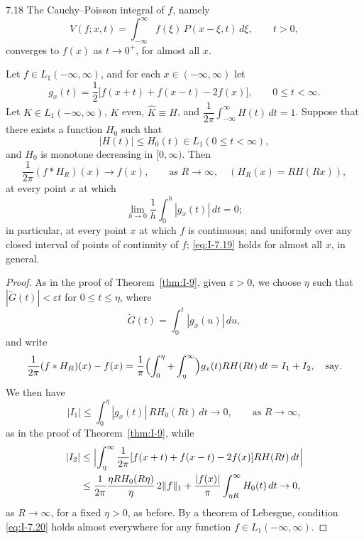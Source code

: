 \begin{nstmt}{7.18}\label{eq:I-7.18}
The Cauchy--Poisson integral of $f$, namely
\[
V(f;x,t)=\int_{-\infty}^{\infty}f(\xi)\,P(x-\xi,t)\,d\xi,\qquad t>0,
\]
converges to $f(x)$ as $t\to 0^+$, for almost all $x$.
\end{nstmt}

\begin{theorem}\label{thm:I-10}
Let $f\in L_1(-\infty,\infty)$, and for each $x\in(-\infty,\infty)$ let
\begin{equation*}
g_x(t)=\frac12\bigl[f(x+t)+f(x-t)-2f(x)\bigr],\qquad 0\le t<\infty.
\end{equation*}
Let $K\in L_1(-\infty,\infty)$, $K$ even, $\hat K\equiv H$, and $\dfrac{1}{2\pi}\int_{-\infty}^{\infty}H(t)\,dt=1$. Suppose that there exists a function $H_0$ such that
\begin{equation*}
|H(t)|\le H_0(t)\in L_1(0\le t<\infty),
\end{equation*}
and $H_0$ is monotone decreasing in $[0,\infty)$. Then
\begin{equation}\tag{7.19}\label{eq:I-7.19}
\frac{1}{2\pi}(f*H_R)(x)\to f(x),\qquad\text{as }R\to\infty,\quad(H_R(x)=RH(Rx)),
\end{equation}
at every point $x$ at which
\begin{equation}\label{eq:I-7.20}\tag{7.20}
\lim_{h\to 0}\frac{1}{h}\int_0^h|g_x(t)|\,dt=0;
\end{equation}
in particular, at every point $x$ at which $f$ is continuous; and uniformly over any closed interval of points of continuity of $f$; \eqref{eq:I-7.19} holds for almost all $x$, in general.
\end{theorem}

\begin{proof}
As in the proof of Theorem~\ref{thm:I-9}, given $\varepsilon>0$, we choose $\eta$ such that $|\widetilde G(t)|<\varepsilon t$ for $0\le t\le\eta$, where
\begin{equation*}
\widetilde G(t)=\int_0^t|g_x(u)|\,du,
\end{equation*}
and write
\begin{equation*}
\frac{1}{2\pi}(f*H_R)(x)-f(x)
=\frac{1}{\pi}\Bigl(\int_0^\eta+\int_\eta^\infty\Bigr)g_x(t)RH(Rt)\,dt
=I_1+I_2,\quad\text{say}.
\end{equation*}
We then have
\begin{equation*}
|I_1|\le\int_0^\eta|g_x(t)|\,RH_0(Rt)\,dt\to 0,\qquad\text{as }R\to\infty,
\end{equation*}
as in the proof of Theorem~\ref{thm:I-9}, while
\begin{equation*}
\begin{aligned}
|I_2| &\le \Bigl|\int_\eta^\infty\frac{1}{2\pi}[f(x+t)+f(x-t)-2f(x)]RH(Rt)\,dt\Bigr|\\
&\le \frac{1}{2\pi}\frac{\eta RH_0(R\eta)}{\eta}\,2\|f\|_1
+\frac{|f(x)|}{\pi}\int_{\eta R}^\infty H_0(t)\,dt\to 0,
\end{aligned}
\end{equation*}
as $R\to\infty$, for a fixed $\eta>0$, as before. By a theorem of Lebesgue, condition \eqref{eq:I-7.20} holds almost everywhere for any function $f\in L_1(-\infty,\infty)$.
\end{proof}

